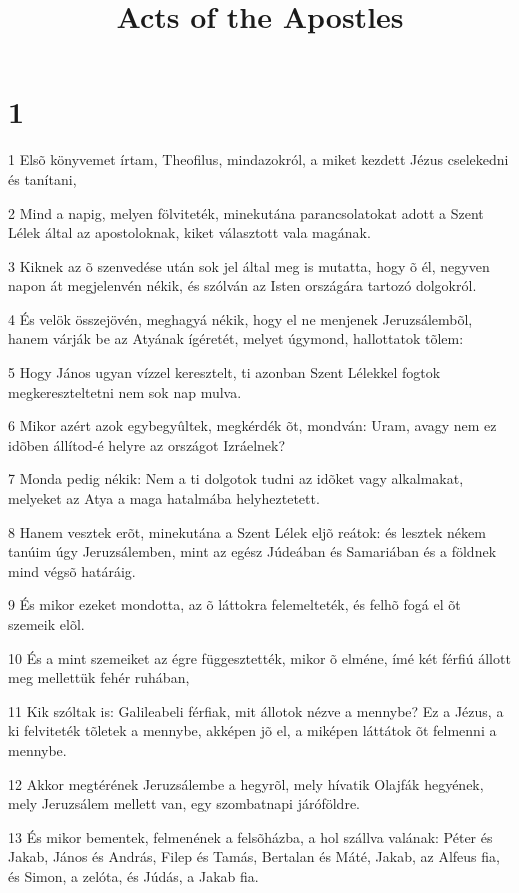 

\title{Acts of the Apostles}


\chapter{1}

\par 1 Elsõ könyvemet írtam, Theofilus, mindazokról, a miket kezdett Jézus cselekedni és tanítani,
\par 2 Mind a napig, melyen fölviteték, minekutána parancsolatokat adott a Szent Lélek által az apostoloknak, kiket választott vala magának.
\par 3 Kiknek az õ szenvedése után sok jel által meg is mutatta, hogy õ él, negyven napon át megjelenvén nékik, és szólván az Isten országára tartozó dolgokról.
\par 4 És velök összejövén, meghagyá nékik, hogy el ne menjenek Jeruzsálembõl, hanem várják be az Atyának ígéretét,  melyet úgymond, hallottatok tõlem:
\par 5 Hogy János ugyan vízzel keresztelt, ti azonban Szent Lélekkel fogtok megkereszteltetni nem sok nap mulva.
\par 6 Mikor azért azok egybegyûltek, megkérdék õt, mondván: Uram, avagy nem ez idõben állítod-é helyre az országot Izráelnek?
\par 7 Monda pedig nékik: Nem a ti dolgotok tudni az idõket vagy alkalmakat, melyeket az Atya a maga hatalmába helyheztetett.
\par 8 Hanem vesztek erõt, minekutána a Szent Lélek eljõ reátok: és lesztek nékem tanúim úgy Jeruzsálemben, mint az egész Júdeában és Samariában és a földnek mind végsõ határáig.
\par 9 És mikor ezeket mondotta, az õ láttokra felemelteték, és felhõ fogá el õt szemeik elõl.
\par 10 És a mint szemeiket az égre függesztették, mikor õ elméne, ímé két férfiú állott meg mellettük fehér ruhában,
\par 11 Kik szóltak is: Galileabeli férfiak, mit állotok nézve a mennybe? Ez a Jézus, a ki felviteték tõletek a mennybe, akképen jõ el, a miképen láttátok õt felmenni a mennybe.
\par 12 Akkor megtérének Jeruzsálembe a hegyrõl, mely hívatik Olajfák hegyének, mely Jeruzsálem mellett van, egy szombatnapi járóföldre.
\par 13 És mikor bementek, felmenének a felsõházba, a hol szállva valának: Péter és Jakab, János és András, Filep és Tamás, Bertalan és Máté, Jakab, az Alfeus fia, és Simon, a zelóta, és Júdás, a Jakab fia.

